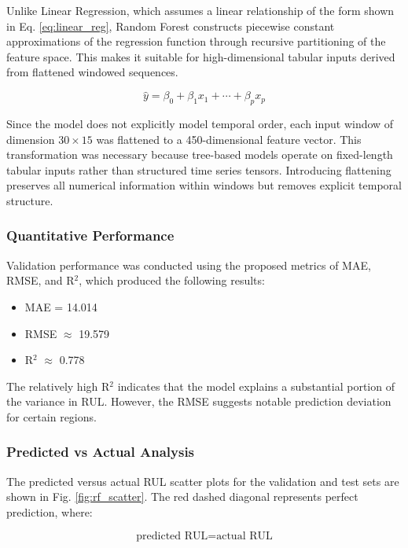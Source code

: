 \documentclass[conference]{IEEEtran}
\begin{document}
Unlike Linear Regression, which assumes a linear relationship of the form shown in Eq. \eqref{eq:linear_reg}, Random Forest constructs piecewise constant approximations of the regression function through recursive partitioning of the feature space. This makes it suitable for high-dimensional tabular inputs derived from flattened windowed sequences.

\begin{equation}
\hat{y} = \beta_0 + \beta_1 x_1 + \cdots + \beta_p x_p
\label{eq:linear_reg}
\end{equation}

Since the model does not explicitly model temporal order, each input window of dimension $30 \times 15$ was flattened to a 450-dimensional feature vector. This transformation was necessary because tree-based models operate on fixed-length tabular inputs rather than structured time series tensors. Introducing flattening preserves all numerical information within windows but removes explicit temporal structure.

\subsubsection{Quantitative Performance}
Validation performance was conducted using the proposed metrics of MAE, RMSE, and R$^2$, which produced the following results:

\begin{itemize}
    \item MAE = 14.014
    \item RMSE $\approx$ 19.579
    \item R$^2$ $\approx$ 0.778
\end{itemize}

The relatively high R$^2$ indicates that the model explains a substantial portion of the variance in RUL. However, the RMSE suggests notable prediction deviation for certain regions.

\subsubsection{Predicted vs Actual Analysis}
The predicted versus actual RUL scatter plots for the validation and test sets are shown in Fig. \ref{fig:rf_scatter}. The red dashed diagonal represents perfect prediction, where:

\begin{equation}
\text{predicted RUL} = \text{actual RUL}
\label{eq:perfect_pred}
\end{equation}
\end{document}
